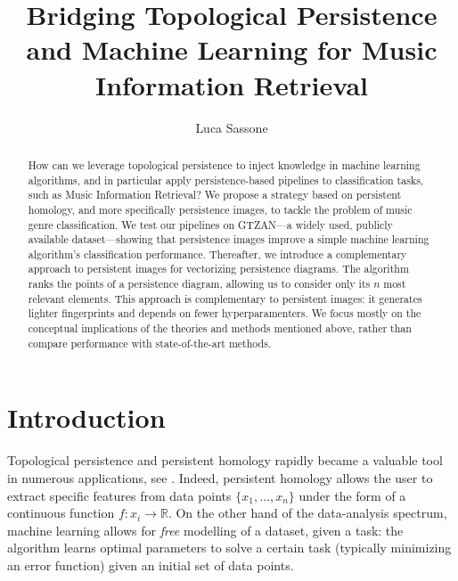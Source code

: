 \documentclass[english, LaM, oneside, noexaminfo]{sapthesis}
\title{Bridging Topological Persistence and Machine Learning for Music Information Retrieval}
\author{Luca Sassone}
\begin{document}
\frontmatter
\maketitle

\tableofcontents

\mainmatter
\nocite{*}

\begin{abstract}

How can we leverage topological persistence to inject knowledge in machine learning algorithms, and in particular apply persistence-based pipelines to classification tasks, such as Music Information Retrieval? We propose a strategy based on persistent homology, and more specifically persistence images, to tackle the problem of music genre classification. We test our pipelines on GTZAN---a widely used, publicly available dataset---showing that persistence images improve a simple machine learning algorithm's classification performance.
Thereafter, we introduce a complementary approach to persistent images for vectorizing persistence diagrams. The algorithm ranks the points of a persistence diagram, allowing us to consider only its $n$ most relevant elements. This approach is complementary to persistent images: it generates lighter fingerprints and depends on fewer hyperparamenters.
We focus mostly on the conceptual implications of the theories and methods mentioned above, rather than compare performance with state-of-the-art methods.




\end{abstract}

\chapter{Introduction}\label{chapter 1}

Topological persistence and persistent homology rapidly became a valuable tool in numerous applications, see \cite{ferri2017persistent}. Indeed, persistent homology allows the user to extract specific features from data points $\{x_1, \dots, x_n\}$ under the form of a continuous function $f:x_i\rightarrow\mathbb{R}$. On the other hand of the data-analysis spectrum, machine learning allows for \textit{free} modelling of a dataset, given a task: the algorithm learns optimal parameters to solve a certain task (typically minimizing an error function) given an initial set of data points.
\end{document}
